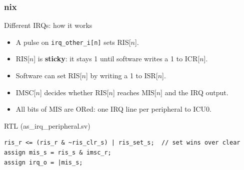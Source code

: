 \documentclass{beamer}
\newcommand{\astitle}{nix}
\newcommand{\assubtitle}{nix}
\newcommand{\cmd}[1]{\texttt{#1}}
\begin{document}
\renewcommand{\assubtitle}{Different IRQs: how it works}
\begin{frame}[fragile]
\frametitle{\astitle}
\begin{block}{\assubtitle}
  \begin{itemize}
    \item A pulse on \cmd{irq\_other\_i[n]} sets RIS[$n$].
    \item RIS[$n$] is \textbf{sticky}: it stays 1 until software writes a 1 to ICR[$n$].
    \item Software can set RIS[$n$] by writing a 1 to ISR[$n$].
    \item IMSC[$n$] decides whether RIS[$n$] reaches MIS[$n$] and the IRQ output.
    \item All bits of MIS are ORed: one IRQ line per peripheral to ICU0.
  \end{itemize}
\end{block}
\begin{block}{RTL (as\_irq\_peripheral.sv)}
\begin{lstlisting}
ris_r <= (ris_r & ~ris_clr_s) | ris_set_s;  // set wins over clear
assign mis_s = ris_s & imsc_r;
assign irq_o = |mis_s;
\end{lstlisting}
\end{block}
\end{frame}
\end{document}
